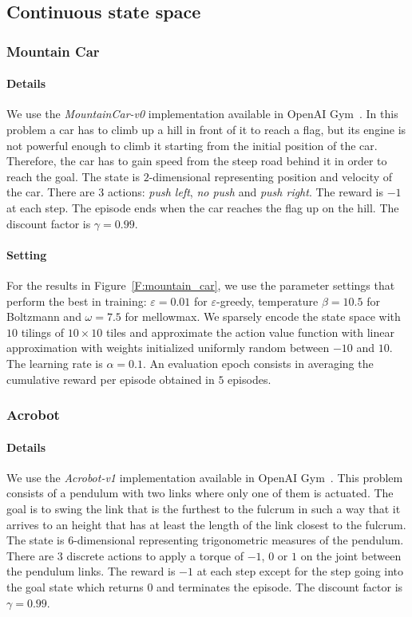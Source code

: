 \subsection{Continuous state space}
\subsubsection{Mountain Car}
\paragraph{Details} We use the \textit{MountainCar-v0} implementation available in OpenAI Gym~\cite{gym}. In this problem a car has to climb up a hill in front of it to reach a flag, but its engine is not powerful enough to climb it starting from the initial position of the car. Therefore, the car has to gain speed from the steep road behind it in order to reach the goal. The state is $2$-dimensional representing position and velocity of the car. There are $3$ actions: \textit{push left}, \textit{no push} and \textit{push right}. The reward is $-1$ at each step. The episode ends when the car reaches the flag up on the hill. The discount factor is $\gamma = 0.99$.
\paragraph{Setting} For the results in Figure~\ref{F:mountain_car}, we use the parameter settings that perform the best in training: $\varepsilon = 0.01$ for $\varepsilon$-greedy, temperature $\beta = 10.5$ for Boltzmann and $\omega = 7.5$ for mellowmax. We sparsely encode the state space with $10$ tilings of $10 \times 10$ tiles and approximate the action value function with linear approximation with weights initialized uniformly random between $-10$ and $10$. The learning rate is $\alpha = 0.1$. An evaluation epoch consists in averaging the cumulative reward per episode obtained in $5$ episodes.

\subsubsection{Acrobot}
\paragraph{Details} We use the \textit{Acrobot-v1} implementation available in OpenAI Gym~\cite{gym}. This problem consists of a pendulum with two links where only one of them is actuated. The goal is to swing the link that is the furthest to the fulcrum in such a way that it arrives to an height that has at least the length of the link closest to the fulcrum. The state is $6$-dimensional representing trigonometric measures of the pendulum. There are $3$ discrete actions to apply a torque of $-1$, $0$ or $1$ on the joint between the pendulum links. The reward is $-1$ at each step except for the step going into the goal state which returns $0$ and terminates the episode. The discount factor is $\gamma = 0.99$. 
